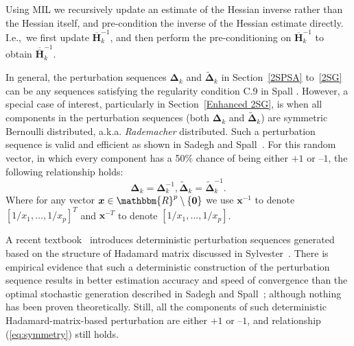 \documentclass[conference]{IEEEtran}
\newcommand{\bDelta}{\bm{\Delta}}
\newcommand{\oH}{\bm{\overline{H}}}
\newcommand{\ooH}{\bm{\overline{\overline{H}}}}
\newcommand{\tDelta}{\bm{\tilde{\Delta}}}
\newcommand{\remove}[1]{}
\newcommand{\bigie}{I.e.,\ }
\begin{document}
Using MIL we recursively update an estimate of the
Hessian inverse rather than the Hessian itself, and
pre-condition the inverse of the Hessian estimate directly.
{
\bigie we first update $ \oH_k^{-1} $, and then
perform the pre-conditioning on $ \oH_k^{-1} $ to obtain $\ooH_k^{-1}$.
}

\remove{ %
Additionally, every Hessian update and/or its inverse has to
remain symmetric at each iteration. Bar-Itzhack~\cite{Bar-Itzhack1998}
shows that for any matrix $ \bm{P}\in\mathbb{R}^{p\times p} $, the
closest symmetric matrix to $ \bm{P} $, in Frobenius (Euclidean) norm,
is $ (\bm{P}+\bm{P}^T)/2 $. This further validates how Spall
\cite{Spall2000} and Spall~\cite{Spall2009} proceed with the
symmetrization.}

In general, the perturbation sequences $\bDelta_k$ and
$\tDelta_k$ in Section~\ref{2SPSA} to~\ref{2SG} can be any sequences
satisfying the regularity condition C.9 in Spall
\cite{Spall2009}. However, a special case of interest, particularly in
Section~\ref{Enhanced 2SG}, is when
all components in the perturbation sequences (both $ \bDelta_k $ and
$\tDelta_k $) are symmetric Bernoulli distributed,
a.k.a. \textit{Rademacher} distributed. Such a perturbation sequence
is valid and efficient as shown in Sadegh and Spall~\cite{Sadegh1998}. For this
random vector, in which every component has a 50\% chance of being either $+1$ or
$\text{--}1$, the following relationship holds:
\begin{equation} \label{eq:symmetry}
\bDelta_k=\bDelta_k^{-1}, \tDelta_k=\tDelta_k^{-1}.
\end{equation}
Where for any vector
$ \bm{x}\in \mathbbm{R}^p \setminus \{\bm{0}\} $
we use $\bm{x}^{-1}$ to denote $[1/x_1, \ldots, 1/x_p]^T$ and
$ \bm{x}^{-T} $ to denote $[1/x_1, \ldots, 1/x_p]$.

A recent textbook~\cite{Bhatnagar2012} introduces
deterministic perturbation sequences generated based on the structure
of Hadamard matrix discussed in Sylvester~\cite{Sylvester1867}. There
is empirical evidence that such a deterministic construction of the
perturbation sequence results in better estimation
accuracy and speed of convergence than the optimal stochastic
generation described in Sadegh and Spall~\cite{Sadegh1998}; although
nothing has been proven theoretically. Still, all the components of
such deterministic
Hadamard-matrix-based perturbation are either $+1$ or $\text{--}1$,
and relationship (\ref{eq:symmetry}) still holds.
\end{document}
